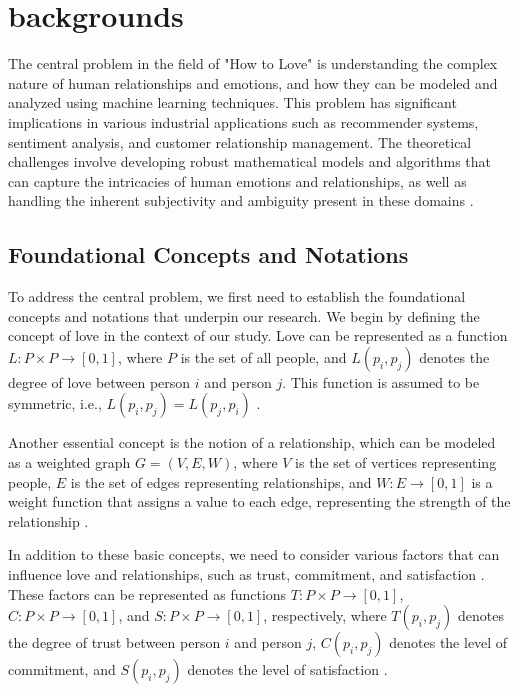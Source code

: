 \section{backgrounds}

The central problem in the field of "How to Love" is understanding the complex nature of human relationships and emotions, and how they can be modeled and analyzed using machine learning techniques. This problem has significant implications in various industrial applications such as recommender systems, sentiment analysis, and customer relationship management. The theoretical challenges involve developing robust mathematical models and algorithms that can capture the intricacies of human emotions and relationships, as well as handling the inherent subjectivity and ambiguity present in these domains \citep{wickens2021engineering, fiske2018social}.

\subsection{Foundational Concepts and Notations}

To address the central problem, we first need to establish the foundational concepts and notations that underpin our research. We begin by defining the concept of love in the context of our study. Love can be represented as a function $L: P \times P \rightarrow [0, 1]$, where $P$ is the set of all people, and $L(p_i, p_j)$ denotes the degree of love between person $i$ and person $j$. This function is assumed to be symmetric, i.e., $L(p_i, p_j) = L(p_j, p_i)$ \citep{heider1958the}. 

Another essential concept is the notion of a relationship, which can be modeled as a weighted graph $G = (V, E, W)$, where $V$ is the set of vertices representing people, $E$ is the set of edges representing relationships, and $W: E \rightarrow [0, 1]$ is a weight function that assigns a value to each edge, representing the strength of the relationship \citep{petersen1994the}. 

In addition to these basic concepts, we need to consider various factors that can influence love and relationships, such as trust, commitment, and satisfaction \citep{garbarino1999the}. These factors can be represented as functions $T: P \times P \rightarrow [0, 1]$, $C: P \times P \rightarrow [0, 1]$, and $S: P \times P \rightarrow [0, 1]$, respectively, where $T(p_i, p_j)$ denotes the degree of trust between person $i$ and person $j$, $C(p_i, p_j)$ denotes the level of commitment, and $S(p_i, p_j)$ denotes the level of satisfaction \citep{gross2003individual, house1988social}.

